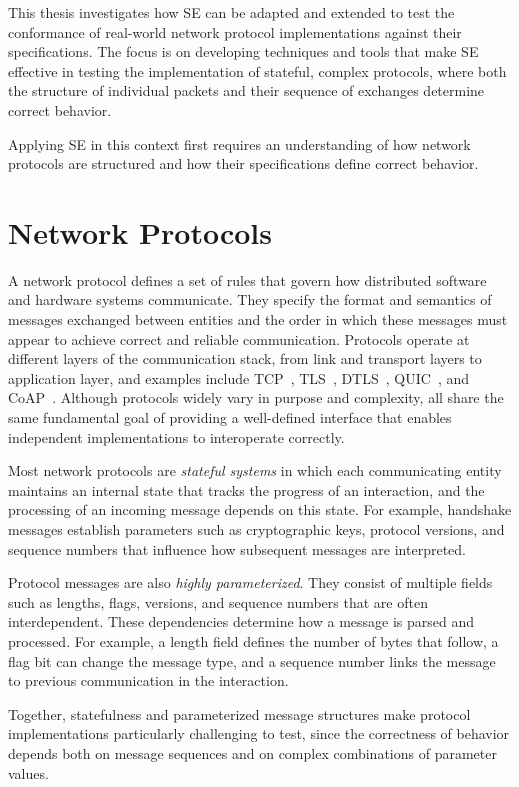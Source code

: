 This thesis investigates how SE can be adapted and extended to test the conformance of real-world network protocol implementations against their specifications.
The focus is on developing techniques and tools that make SE effective in testing the implementation of stateful, complex protocols, where both the structure of individual packets and their sequence of exchanges determine correct behavior.

Applying SE in this context first requires an understanding of how network protocols are structured and how their specifications define correct behavior.

\section{Network Protocols}
A network protocol defines a set of rules that govern how distributed software and hardware systems communicate.
They specify the format and semantics of messages exchanged between entities and the order in which these messages must appear to achieve correct and reliable communication.
Protocols operate at different layers of the communication stack, from link and transport layers to application layer, and examples include TCP~\cite{RFC9293}, TLS~\cite{RFC5746}, DTLS~\cite{RFC6347}, QUIC~\cite{RFC9000}, and CoAP~\cite{RFC7252}.
Although protocols widely vary in purpose and complexity, all share the same fundamental goal of providing a well-defined interface that enables independent implementations to interoperate correctly.

Most network protocols are \emph{stateful systems} in which each communicating entity maintains an internal state that tracks the progress of an interaction, and the processing of an incoming message depends on this state.
For example, handshake messages establish parameters such as cryptographic keys, protocol versions, and sequence numbers that influence how subsequent messages are interpreted.

Protocol messages are also \emph{highly parameterized}.
They consist of multiple fields such as lengths, flags, versions, and sequence numbers that are often interdependent.
These dependencies determine how a message is parsed and processed.
For example, a length field defines the number of bytes that follow, a flag bit can change the message type, and a sequence number links the message to previous communication in the interaction.

Together, statefulness and parameterized message structures make protocol implementations particularly challenging to test, since the correctness of behavior depends both on message sequences and on complex combinations of parameter values.

